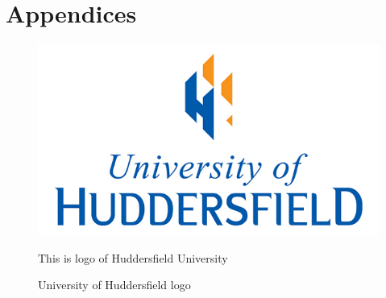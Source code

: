 \documentclass[11pt,a4paper]{report}
\begin{document}
\section*{Appendices}
\bigskip
\begin{figure}[hb]
\centering
\includegraphics[width=6in]{figures/hud.png} 
\caption{ University of Huddersfield logo  }
This is logo of Huddersfield University  
\label{fig: hud_fig}
\end{figure}
\end{document}

